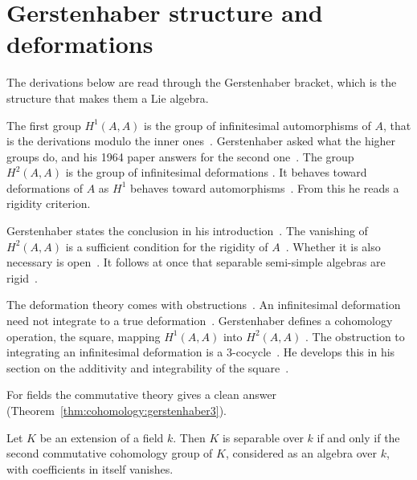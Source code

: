\section{Gerstenhaber structure and deformations}\label{sec:cohomology:gerstenhaber}

The derivations below are read through the Gerstenhaber bracket, which is the structure that makes them a Lie algebra.

The first group $H^1(A,A)$ is the group of infinitesimal automorphisms of $A$,
that is the derivations modulo the inner
ones~\cite[pp.~59--60]{Gerstenhaber1964}. Gerstenhaber asked what the higher
groups do, and his 1964 paper answers for the second
one~\cite[pp.~59--60]{Gerstenhaber1964}. The group $H^2(A,A)$ is the group of
infinitesimal deformations
\cite[pp.~59--60]{Gerstenhaber1964}. It behaves toward deformations of $A$ as
$H^1$ behaves toward
automorphisms~\cite[pp.~59--60]{Gerstenhaber1964}. From this he reads a
rigidity criterion.

Gerstenhaber states the conclusion in his
introduction~\cite[p.~60]{Gerstenhaber1964}. The vanishing of $H^2(A,A)$ is a
sufficient condition for the rigidity of $A$~\cite[p.~60]{Gerstenhaber1964}.
Whether it is also necessary is open~\cite[p.~60]{Gerstenhaber1964}. It follows
at once that separable semi-simple algebras are
rigid~\cite[pp.~59--60]{Gerstenhaber1964}.

The deformation theory comes with
obstructions~\cite[\S 6]{Gerstenhaber1964}. An infinitesimal deformation need
not integrate to a true deformation~\cite[\S 6]{Gerstenhaber1964}. Gerstenhaber
defines a cohomology operation, the square, mapping $H^1(A,A)$ into $H^2(A,A)$
\cite[\S 6]{Gerstenhaber1964}. The obstruction to integrating an infinitesimal
deformation is a $3$-cocycle~\cite[pp.~60--61, \S 6]{Gerstenhaber1964}. He
develops this in his section on the additivity and integrability of the
square~\cite[pp.~60--61, \S 6]{Gerstenhaber1964}.

For fields the commutative theory gives a clean answer (Theorem~\ref{thm:cohomology:gerstenhaber3}).

\begin{theorem}\label{thm:cohomology:gerstenhaber3}
Let $K$ be an extension of a field $k$. Then $K$ is separable over $k$ if and only
if the second commutative cohomology group of $K$, considered as an algebra over
$k$, with coefficients in itself vanishes.
\end{theorem}

